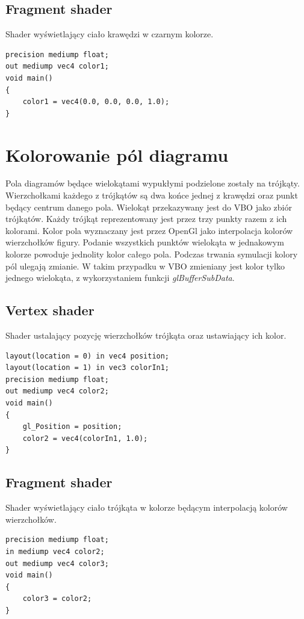 \documentclass[declaration,shortabstract, inz]{iithesis}
\theoremstyle{definition} \newtheorem{definition}{Definicja}[]
\theoremstyle{plain} \newtheorem{remark}[definition]{Obserwacja}
\theoremstyle{plain} \newtheorem{theorem}[definition]{Twierdzenie}
\theoremstyle{plain} \newtheorem{example}{Przykład}[definition]
\theoremstyle{plain} \newtheorem{lemma}[definition]{Lemat}
\begin{document}
\subsection{Fragment shader}
Shader wyświetlający ciało krawędzi w czarnym kolorze.
\begin{center}
\begin{lstlisting}
precision mediump float;
out mediump vec4 color1;
void main()
{
	color1 = vec4(0.0, 0.0, 0.0, 1.0);
}
\end{lstlisting}
\end{center}

\section{Kolorowanie pól diagramu}

Pola diagramów będące wielokątami wypukłymi podzielone zostały na trójkąty. Wierzchołkami każdego z trójkątów są dwa końce jednej z krawędzi oraz punkt będący centrum danego pola. Wielokąt przekazywany jest do VBO jako zbiór trójkątów. Każdy trójkąt reprezentowany jest przez trzy punkty razem z ich kolorami. Kolor pola wyznaczany jest przez OpenGl jako interpolacja kolorów wierzchołków figury. Podanie wszystkich punktów wielokąta w jednakowym kolorze powoduje jednolity kolor całego pola. Podczas trwania symulacji kolory pól ulegają zmianie. W takim przypadku w VBO zmieniany jest kolor tylko jednego wielokąta, z wykorzystaniem funkcji \textit{glBufferSubData}.

\subsection{Vertex shader}
Shader ustalający pozycję wierzchołków trójkąta oraz ustawiający ich kolor.
\begin{center}
\begin{lstlisting}
layout(location = 0) in vec4 position;
layout(location = 1) in vec3 colorIn1;
precision mediump float;
out mediump vec4 color2;
void main()
{
	gl_Position = position;
	color2 = vec4(colorIn1, 1.0);
}
\end{lstlisting}
\end{center}

\newpage

\subsection{Fragment shader}
Shader wyświetlający ciało trójkąta w kolorze będącym interpolacją kolorów wierzchołków.
\begin{center}
\begin{lstlisting}
precision mediump float;
in mediump vec4 color2;
out mediump vec4 color3;
void main()
{
	color3 = color2;
}
\end{lstlisting}
\end{center}
\end{document}
